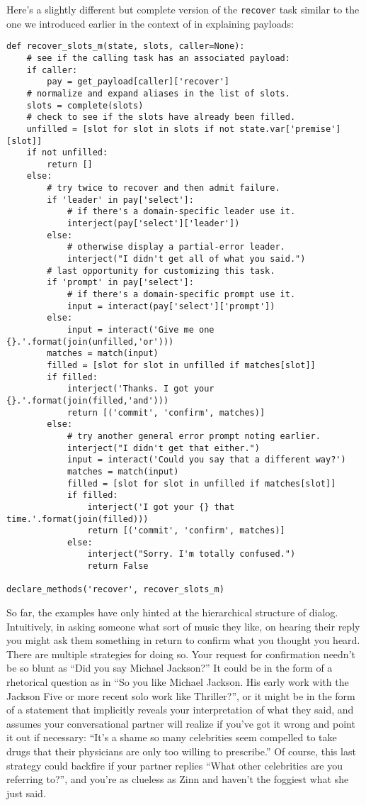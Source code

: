 \documentclass[letterpaper,12pt]{article}
\begin{document}
Here's a slightly different but complete version of the {\tt{recover}} task similar to the one we introduced earlier in the context of in explaining payloads:
%
\begin{verbatim}
def recover_slots_m(state, slots, caller=None):
    # see if the calling task has an associated payload:
    if caller:
        pay = get_payload[caller]['recover']
    # normalize and expand aliases in the list of slots.
    slots = complete(slots)
    # check to see if the slots have already been filled. 
    unfilled = [slot for slot in slots if not state.var['premise'][slot]]
    if not unfilled:
        return []
    else:
        # try twice to recover and then admit failure.
        if 'leader' in pay['select']:
            # if there's a domain-specific leader use it.
            interject(pay['select']['leader'])
        else:
            # otherwise display a partial-error leader.
            interject("I didn't get all of what you said.")
        # last opportunity for customizing this task.
        if 'prompt' in pay['select']:
            # if there's a domain-specific prompt use it.
            input = interact(pay['select']['prompt'])
        else:
            input = interact('Give me one {}.'.format(join(unfilled,'or')))
        matches = match(input)
        filled = [slot for slot in unfilled if matches[slot]]
        if filled:
            interject('Thanks. I got your {}.'.format(join(filled,'and')))
            return [('commit', 'confirm', matches)]
        else:
            # try another general error prompt noting earlier.
            interject("I didn't get that either.")
            input = interact('Could you say that a different way?')
            matches = match(input)
            filled = [slot for slot in unfilled if matches[slot]]
            if filled:
                interject('I got your {} that time.'.format(join(filled)))
                return [('commit', 'confirm', matches)]
            else:
                interject("Sorry. I'm totally confused.")
                return False

declare_methods('recover', recover_slots_m)
\end{verbatim}

So far, the examples have only hinted at the hierarchical structure of dialog. Intuitively, in asking someone what sort of music they like, on hearing their reply you might ask them something in return to confirm what you thought you heard. There are multiple strategies for doing so. Your request for confirmation needn't be so blunt as ``Did you say Michael Jackson?'' It could be in the form of a rhetorical question as in ``So you like Michael Jackson. His early work with the Jackson Five or more recent solo work like Thriller?'', or it might be in the form of a statement that implicitly reveals your interpretation of what they said, and assumes your conversational partner will realize if you've got it wrong and point it out if necessary: ``It's a shame so many celebrities seem compelled to take drugs that their physicians are only too willing to prescribe.'' Of course, this last strategy could backfire if your partner replies ``What other celebrities are you referring to?'', and you're as clueless as Zinn and haven't the foggiest what she just said. 
\end{document}
